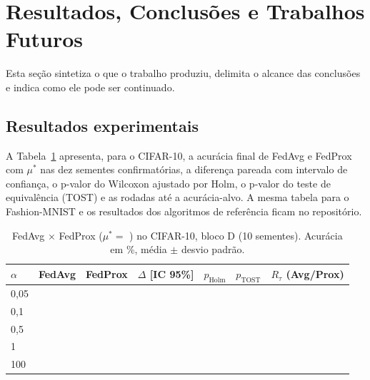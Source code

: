 \section{Resultados, Conclusões e Trabalhos Futuros}
\label{sec:resultados}

Esta seção sintetiza o que o trabalho produziu, delimita o alcance das conclusões e indica como ele pode ser continuado.

\subsection{Resultados experimentais}


A Tabela~\ref{tab:resultados} apresenta, para o CIFAR-10, a acurácia final de FedAvg e FedProx com $\mu^*$ nas dez sementes confirmatórias, a diferença pareada com intervalo de confiança, o p-valor do Wilcoxon ajustado por Holm, o p-valor do teste de equivalência (TOST) e as rodadas até a acurácia-alvo. A mesma tabela para o Fashion-MNIST e os resultados dos algoritmos de referência ficam no repositório.

\begin{table}[ht]
    \centering\scriptsize
    \caption{FedAvg × FedProx ($\mu^* = $ ) no CIFAR-10, bloco D (10 sementes). Acurácia em \%, média $\pm$ desvio padrão.}
    \label{tab:resultados}
    \setlength{\tabcolsep}{3pt}
    \begin{tabular}{@{}lcccccc@{}}
        \toprule
        $\alpha$ & FedAvg & FedProx & $\Delta$ [IC 95\%] & $p_{\text{Holm}}$ & $p_{\text{TOST}}$ & $R_\tau$ (Avg/Prox) \\
        \midrule
        0,05 & \pendente{--} & \pendente{--} & \pendente{--} & \pendente{--} & \pendente{--} & \pendente{--} \\
        0,1  & \pendente{--} & \pendente{--} & \pendente{--} & \pendente{--} & \pendente{--} & \pendente{--} \\
        0,5  & \pendente{--} & \pendente{--} & \pendente{--} & \pendente{--} & \pendente{--} & \pendente{--} \\
        1    & \pendente{--} & \pendente{--} & \pendente{--} & \pendente{--} & \pendente{--} & \pendente{--} \\
        100  & \pendente{--} & \pendente{--} & \pendente{--} & \pendente{--} & \pendente{--} & \pendente{--} \\
        \bottomrule
    \end{tabular}
\end{table}

